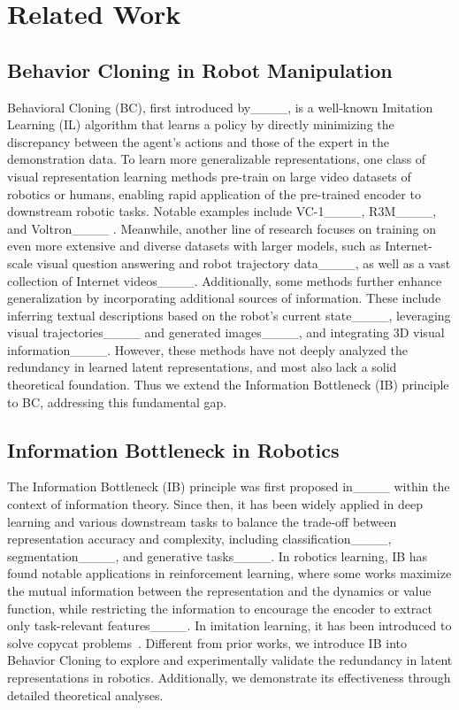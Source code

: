 \section{Related Work}
\label{sec:rw}

\subsection{Behavior Cloning in Robot Manipulation}

Behavioral Cloning (BC), first introduced by____, is a well-known Imitation Learning (IL) algorithm that learns a policy by directly minimizing the discrepancy between the agent's actions and those of the expert in the demonstration data. 
To learn more generalizable representations, one class of visual representation learning methods pre-train on large video datasets of robotics or humans, enabling rapid application of the pre-trained encoder to downstream robotic tasks. Notable examples include VC-1____, R3M____, and Voltron____ . 
Meanwhile, another line of research focuses on training on even more extensive and diverse datasets with larger models, such as Internet-scale visual question answering and robot trajectory data____, as well as a vast collection of Internet videos____.
Additionally, some methods further enhance generalization by incorporating additional sources of information. These include inferring textual descriptions based on the robot's current state____, leveraging visual trajectories____ and generated images____, and integrating 3D visual information____.
However, these methods have not deeply analyzed the redundancy in learned latent representations, and most also lack a solid theoretical foundation. 
Thus we extend the Information Bottleneck (IB) principle to BC, addressing this fundamental gap.


\subsection{Information Bottleneck in Robotics}
The Information Bottleneck (IB) principle was first proposed in____ within the context of information theory. 
Since then, it has been widely applied in deep learning and various downstream tasks to balance the trade-off between representation accuracy and complexity, including classification____, segmentation____, and generative tasks____.
In robotics learning, IB has found notable applications in reinforcement learning, where some works maximize the mutual information between the representation and the dynamics or value function, while restricting the information to encourage the encoder to extract only task-relevant features____. In imitation learning, it has been introduced to solve copycat problems~\cite {wen2020fighting}.
Different from prior works, we introduce IB into Behavior Cloning to explore and experimentally validate the redundancy in latent representations in robotics. 
Additionally, we demonstrate its effectiveness through detailed theoretical analyses.



